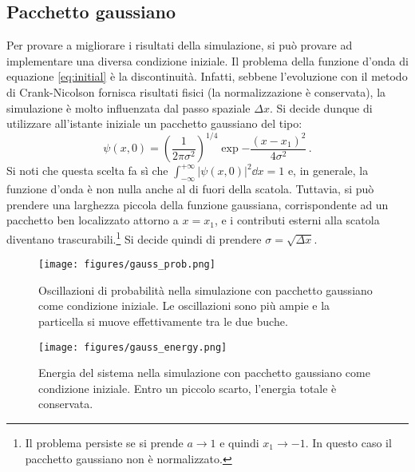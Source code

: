 \documentclass[a4paper, titlepage]{article}
\numberwithin{equation}{section}
\begin{document}
\subsection{Pacchetto gaussiano}
Per provare a migliorare i risultati della simulazione, si può provare ad implementare una diversa condizione iniziale. Il problema della funzione d'onda di equazione \eqref{eq:initial} è la discontinuità. Infatti, sebbene l'evoluzione con il metodo di Crank-Nicolson fornisca risultati fisici (la normalizzazione è conservata), la simulazione è molto influenzata dal passo spaziale $\Delta x$. Si decide dunque di utilizzare all'istante iniziale un pacchetto gaussiano del tipo:
\begin{equation*}
    \psi(x, 0) = \left(\frac{1}{2\pi\sigma^2}\right)^{1/4}\exp{-\frac{(x-x_1)^2}{4\sigma^2}}\, .
\end{equation*}
Si noti che questa scelta fa sì che $\int_{-\infty}^{+\infty} |\psi(x,0)|^2 \dd x = 1$ e, in generale, la funzione d'onda è non nulla anche al di fuori della scatola. Tuttavia, si può prendere una larghezza piccola della funzione gaussiana, corrispondente ad un pacchetto ben localizzato attorno a $x = x_1$, e i contributi esterni alla scatola diventano trascurabili.\footnote{Il problema persiste se si prende $a \to 1$ e quindi $x_1 \to -1$. In questo caso il pacchetto gaussiano non è normalizzato.} 
Si decide quindi di prendere $\sigma = \sqrt{\Delta x}$.
\begin{figure}[h!]
    \centering
    \begin{minipage}[t]{0.47 \textwidth}
        \centering
        \texttt{[image: figures/gauss\_prob.png]}
        \caption{Oscillazioni di probabilità nella simulazione con pacchetto gaussiano come condizione iniziale. Le oscillazioni sono più ampie e la particella si muove effettivamente tra le due buche.}
        \label{fig:gauss_prob}
    \end{minipage}
    \hspace{0.02\textwidth}
    \begin{minipage}[t]{0.47 \textwidth}
        \centering
        \texttt{[image: figures/gauss\_energy.png]}
        \caption{Energia del sistema nella simulazione con pacchetto gaussiano come condizione iniziale. Entro un piccolo scarto, l'energia totale è conservata.}
        \label{fig:gauss_energy}
    \end{minipage}
\end{figure}
\end{document}
